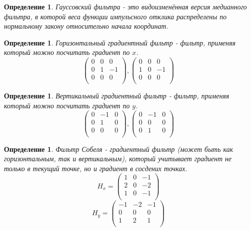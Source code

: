 \documentclass[a4paper,12pt]{article}
\newtheorem{defn}[theorem]{Определение}
\begin{document}
\begin{defn}
    Гауссовский фильтра - это видоизменённая версия медианного фильтра, в которой
    веса функции импульсного отклика распределены по нормальному закону относительно начала
    координат.
\end{defn}

\begin{defn}
    Горизонтальный градиентный фильтр - фильтр, применяя который можно посчитать 
    градиент по $x$. 
    $$
    \begin{pmatrix}
    0 & 0 & 0 \\
    0 & 1 & -1 \\
    0 & 0 & 0 \\
    \end{pmatrix}, 
\begin{pmatrix}
    0 & 0 & 0 \\
    1 & 0 & -1 \\
    0 & 0 & 0 \\
\end{pmatrix}$$
\end{defn}

\begin{defn}
    Вертикальный градиентный фильтр - фильтр, применяя который можно посчитать
    градиент по $y$.
$$ \begin{pmatrix}
    0 & -1 & 0 \\
    0 & 1 & 0 \\
    0 & 0 & 0 \\
\end{pmatrix}, 
\begin{pmatrix}
    0 & -1 & 0 \\
    0 & 0 & 0 \\
    0 & 1 & 0 \\
\end{pmatrix}
$$
\end{defn}

\begin{defn}
    Фильтр Собеля - градиентный фильтр (может быть как горизонтальным, так и 
    вертикальным), который учитывает градиент не только в текущий точке, но и
    градиент в сосдених точках.
    $$H_x = \begin{pmatrix}
    1 & 0 & -1 \\
    2 & 0 & -2 \\
    1 & 0 & -1 \\
\end{pmatrix}$$
$$ H_y = \begin{pmatrix}
    -1 & -2 & -1 \\
    0 & 0 & 0 \\
    1 & 2 & 1 \\
\end{pmatrix}
$$
\end{defn}
\end{document}
